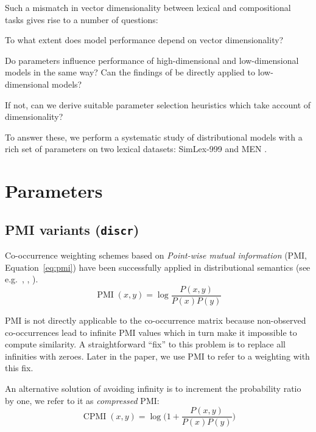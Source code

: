 \documentclass[11pt]{article}
\begin{document}
Such a mismatch in vector dimensionality between lexical and compositional tasks gives rise to a number of questions:
\begin{compactitem}
\item To what extent does model performance depend on vector dimensionality?
\item Do parameters influence performance of high-dimensional and low-dimensional models in the same way? Can the findings of  be directly applied to low-dimensional models?
\item If not, can we derive suitable parameter selection heuristics which take account of dimensionality?
\end{compactitem}

To answer these, we perform a systematic study of distributional models with a rich set of parameters on two lexical datasets: SimLex-999 \cite{hill2014simlex} and MEN \cite{Bruni:2014:MDS:2655713.2655714}.

\section{Parameters}
\label{sec:parameters}



\subsection{PMI variants (\texttt{discr})}
\label{sec:pmi-variants}

Co-occurrence weighting schemes based on \emph{Point-wise mutual information} (PMI, Equation~\ref{eq:pmi}) have been successfully applied in distributional semantics (see e.g.~, , ).
%
\begin{equation}
  \label{eq:pmi}
  \operatorname{PMI}(x, y) = \log\frac{P(x,y)}{P(x)P(y)}
\end{equation}

PMI is not directly applicable to the co-occurrence matrix because non-observed co-occurrences lead to infinite PMI values which in turn make it impossible to compute similarity. A straightforward ``fix'' to this problem is to replace all infinities with zeroes. Later in the paper, we use PMI to refer to a weighting with this fix.

An alternative solution of avoiding infinity is to increment the probability ratio by one, we refer to it as \textit{compressed} PMI:
%
\begin{equation}
  \label{eq:cpmi}
  \operatorname{CPMI}(x, y) = \log\Big( 1 + \frac{P(x,y)}{P(x)P(y)} \Big)
\end{equation}
\end{document}
